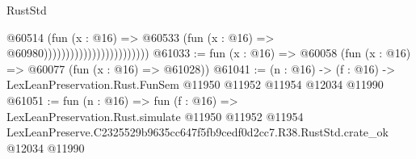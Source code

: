 \begin{lexlean}{RustStd}
\begin{coremodule}
                                              @60514
                                                (fun (x : @16) =>
                                                @60533
                                                  (fun (x : @16) => @60980))))))))))))))))))))))))
@61033 := fun (x : @16) => @60058 (fun (x : @16) => @60077 (fun (x : @16) => @61028))
@61041 := (n : @16) ->
  (f : @16) -> LexLeanPreservation.Rust.FunSem @11950 @11952 @11954 @12034 @11990
@61051 := fun (n : @16) =>
  fun (f : @16) =>
  LexLeanPreservation.Rust.simulate
    @11950
    @11952
    @11954
    LexLeanPreserve.C2325529b9635cc647f5fb9cedf0d2cc7.R38.RustStd.crate_ok
    @12034
    @11990
\end{coremodule}
\end{lexlean}
